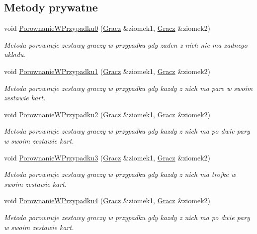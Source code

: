 \subsection*{Metody prywatne}
\begin{DoxyCompactItemize}
\item 
void \hyperlink{class_g_r_a_a2b8440a2cf458585286161fd46ad1bea}{Porownanie\-W\-Przypadku0} (\hyperlink{class_gracz}{Gracz} \&ziomek1, \hyperlink{class_gracz}{Gracz} \&ziomek2)
\begin{DoxyCompactList}\small\item\em Metoda porownuje zestawy graczy w przypadku gdy zaden z nich nie ma zadnego ukladu. \end{DoxyCompactList}\item 
void \hyperlink{class_g_r_a_afcde718df260d05688ef36c7cf51de58}{Porownanie\-W\-Przypadku1} (\hyperlink{class_gracz}{Gracz} \&ziomek1, \hyperlink{class_gracz}{Gracz} \&ziomek2)
\begin{DoxyCompactList}\small\item\em Metoda porownuje zestawy graczy w przypadku gdy kazdy z nich ma pare w swoim zestawie kart. \end{DoxyCompactList}\item 
void \hyperlink{class_g_r_a_a51f60984eea162683d8e831952cceda8}{Porownanie\-W\-Przypadku2} (\hyperlink{class_gracz}{Gracz} \&ziomek1, \hyperlink{class_gracz}{Gracz} \&ziomek2)
\begin{DoxyCompactList}\small\item\em Metoda porownuje zestawy graczy w przypadku gdy kazdy z nich ma po dwie pary w swoim zestawie kart. \end{DoxyCompactList}\item 
void \hyperlink{class_g_r_a_a0f1a4cc74547c599d5b8b808e1613cd0}{Porownanie\-W\-Przypadku3} (\hyperlink{class_gracz}{Gracz} \&ziomek1, \hyperlink{class_gracz}{Gracz} \&ziomek2)
\begin{DoxyCompactList}\small\item\em Metoda porownuje zestawy graczy w przypadku gdy kazdy z nich ma trojke w swoim zestawie kart. \end{DoxyCompactList}\item 
void \hyperlink{class_g_r_a_a69bc4518f57fe02f9218fc6be253f687}{Porownanie\-W\-Przypadku4} (\hyperlink{class_gracz}{Gracz} \&ziomek1, \hyperlink{class_gracz}{Gracz} \&ziomek2)
\begin{DoxyCompactList}\small\item\em Metoda porownuje zestawy graczy w przypadku gdy kazdy z nich ma po dwie pary w swoim zestawie kart. \end{DoxyCompactList}\item 

\end{DoxyCompactItemize}
